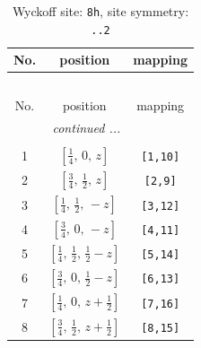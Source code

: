 \documentclass[fleqn,8pt]{jsarticle}
\begin{document}
\begin{longtable}{ccc}
\caption{Wyckoff site: {\tt 8h}, site symmetry: {\tt ..2}}
 \\
 \hline \hline
No. & position & mapping \\ \hline \endfirsthead

\multicolumn{2}{l}{\tablename\ \thetable{}} \\
 \hline \hline
No. & position & mapping \\ \hline \endhead

 \hline \hline
\multicolumn{2}{r}{\footnotesize\it continued ...} \\ \endfoot

 \hline \hline
\multicolumn{2}{r}{} \\ \endlastfoot

1 & $\left[ \frac{1}{4},\, 0,\, z \right]$ & {\tt [1,10]} \\ \hline
2 & $\left[ \frac{3}{4},\, \frac{1}{2},\, z \right]$ & {\tt [2,9]} \\ \hline
3 & $\left[ \frac{1}{4},\, \frac{1}{2},\, - z \right]$ & {\tt [3,12]} \\ \hline
4 & $\left[ \frac{3}{4},\, 0,\, - z \right]$ & {\tt [4,11]} \\ \hline
5 & $\left[ \frac{1}{4},\, \frac{1}{2},\, \frac{1}{2} - z \right]$ & {\tt [5,14]} \\ \hline
6 & $\left[ \frac{3}{4},\, 0,\, \frac{1}{2} - z \right]$ & {\tt [6,13]} \\ \hline
7 & $\left[ \frac{1}{4},\, 0,\, z + \frac{1}{2} \right]$ & {\tt [7,16]} \\ \hline
8 & $\left[ \frac{3}{4},\, \frac{1}{2},\, z + \frac{1}{2} \right]$ & {\tt [8,15]} \\
\end{longtable}
\renewcommand{\arraystretch}{1.2}
\end{document}
